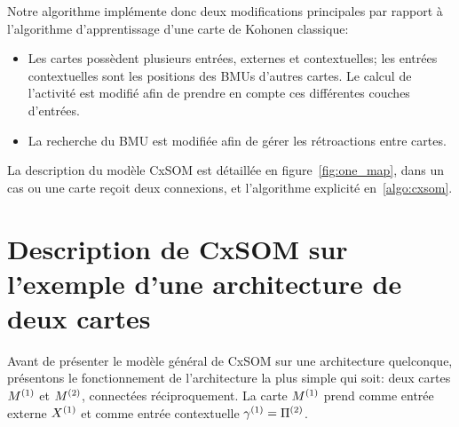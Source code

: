 Notre algorithme implémente donc deux modifications principales par rapport à l'algorithme d'apprentissage d'une carte de Kohonen classique: 
\begin{itemize}
\item Les cartes possèdent plusieurs entrées, externes et contextuelles; les entrées contextuelles sont les positions des BMUs d'autres cartes. Le calcul de l'activité est modifié afin de prendre en compte ces différentes couches d'entrées.
\item La recherche du BMU est modifiée afin de gérer les rétroactions entre cartes.
\end{itemize}

La description du modèle CxSOM est détaillée en figure~\ref{fig:one_map}, dans un cas ou une carte reçoit deux connexions, et l'algorithme explicité en~\ref{algo:cxsom}.

\section{Description de CxSOM sur l'exemple d'une architecture de deux cartes}
Avant de présenter le modèle général de CxSOM sur une architecture quelconque, présentons le fonctionnement de l'architecture la plus simple qui soit: deux cartes $M^{({1})}$ et $M^{({2})}$, connectées réciproquement.
La carte $M^{({1})}$ prend comme entrée externe $X^{({1})}$ et comme entrée contextuelle $\gamma^{({1})} = \Pi^{({2})}$.

